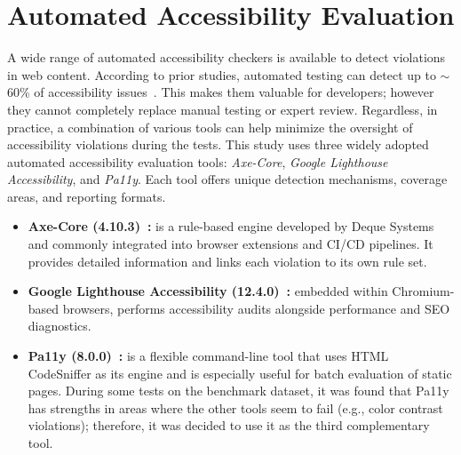 \section{Automated Accessibility Evaluation}
A wide range of automated accessibility checkers is available to 
detect violations in web content.
According to prior studies, automated testing can detect up to $\sim$60\% 
of accessibility issues~\cite{deque2023accessibility}. This makes them 
valuable for developers; however they cannot completely replace manual testing or 
expert review.
Regardless, in practice, a combination of various tools can help minimize the 
oversight of accessibility violations during the tests.\newline
This study uses three widely adopted automated accessibility evaluation 
tools: \textit{Axe-Core}, \textit{Google Lighthouse Accessibility},
and \textit{Pa11y}. Each tool offers unique detection mechanisms,
coverage areas, and reporting formats.
\begin{itemize}
  \item \textbf{Axe-Core (4.10.3)~\cite{web:axecore}:} is a rule-based engine
  developed by Deque Systems and commonly integrated into browser 
  extensions and CI/CD pipelines. It provides detailed information
  and links each violation to its own rule set.
  \item \textbf{Google Lighthouse Accessibility (12.4.0)~\cite{web:lighthouse}:} 
  embedded within Chromium-based browsers, performs accessibility audits
  alongside performance and SEO diagnostics.
  \item \textbf{Pa11y (8.0.0)~\cite{web:pa11y}:} is a flexible command-line tool 
  that uses HTML CodeSniffer as its engine and is especially useful for batch 
  evaluation of static pages. During some tests on the benchmark dataset, 
  it was found that Pa11y has strengths in areas where the other 
  tools seem to fail (e.g., color contrast violations); therefore, it was 
  decided to use it as the third complementary tool.
\end{itemize}
 
